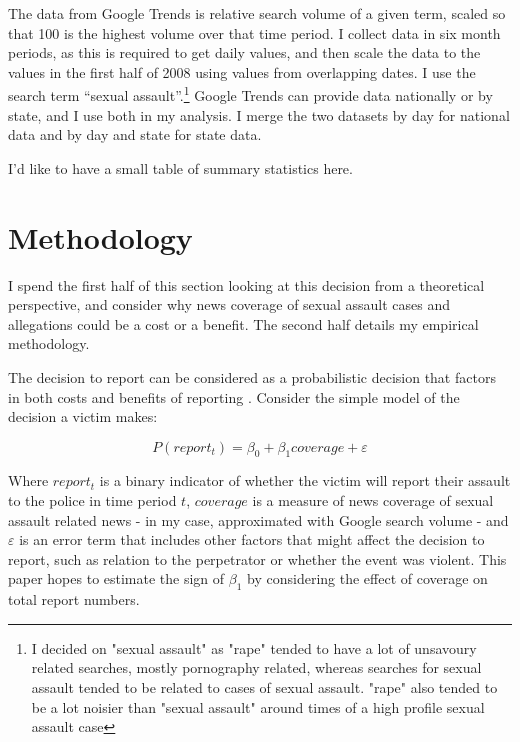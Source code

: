\documentclass[AER,draftmode]{AEA}
\begin{document}
The data from Google Trends is relative search volume of a given term, scaled so that 100 is the highest volume over that time period. I collect data in six month periods, as this is required to get daily values, and then scale the data to the values in the first half of 2008 using values from overlapping dates. I use the search term “sexual assault”.\footnote{I decided on "sexual assault" as "rape" tended to have a lot of unsavoury related searches, mostly pornography related, whereas searches for sexual assault tended to be related to cases of sexual assault. "rape" also tended to be a lot noisier than "sexual assault" around times of a high profile sexual assault case} Google Trends can provide data nationally or by state, and I use both in my analysis. I merge the two datasets by day for national data and by day and state for state data.

I'd like to have a small table of summary statistics here.

\section{Methodology}

I spend the first half of this section looking at this decision from a theoretical perspective, and consider why news coverage of sexual assault cases and allegations could be a cost or a benefit. The second half details my empirical methodology.

The decision to report can be considered as a probabilistic decision that factors in both costs and benefits of reporting \cite{allen_reporting_2007}. Consider the simple model of the decision a victim makes:

$$
P(report_t) = \beta_0 + \beta_1 coverage + \varepsilon
$$

Where $report_t$ is a binary indicator of whether the victim will report their assault to the police in time period $t$, $coverage$ is a measure of news coverage of sexual assault related news - in my case, approximated with Google search volume - and $\varepsilon$ is an error term that includes other factors that might affect the decision to report, such as relation to the perpetrator or whether the event was violent. This paper hopes to estimate the sign of $\beta_1$ by considering the effect of coverage on total report numbers. 
\end{document}
